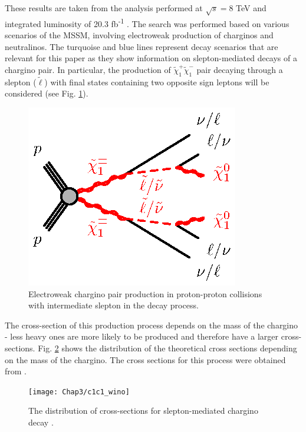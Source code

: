 These results are taken from the  analysis performed at $\sqrt{s}=$8 TeV and integrated luminosity of 20.3 fb\textsuperscript{-1} \citep{atlas2015search}. The search was performed based on various scenarios of the MSSM, involving electroweak production of charginos and neutralinos. The turquoise and blue lines represent decay scenarios that are relevant for this paper as they show information on slepton-mediated decays of a chargino pair. 
In particular, the production of $\tilde{\chi}^{+}_{1}\tilde{\chi}^{-}_{1}$ pair decaying through a slepton ($\tilde{\ell}$) with final states containing two opposite sign leptons will be considered (see Fig. \ref{fig:EWchargino}). 
\begin{figure}[!h]
  \centering   	
  	\captionsetup{width=0.8\textwidth}
	\includegraphics[]{Chap2/C1C1-llvvN1N1-slsnu}	
\caption[Feynman diagram of slepton-mediated chargino decay]{Electroweak chargino pair production in proton-proton collisions with intermediate slepton in the decay process.}\label{fig:EWchargino}
\end{figure}  

The cross-section of this production process depends on the mass of the chargino - less heavy ones are more likely to be produced and therefore have a larger cross-sections. Fig. \ref{fig:xsec} shows the distribution of the theoretical cross sections depending on the mass of the chargino.
The cross sections for this process were obtained from \citep{Fuks:2012qx,Fuks:2013vua}.

\begin{figure}
\centering
 \captionsetup{width=0.8\textwidth}
	\texttt{[image: Chap3/c1c1\_wino]}
	\caption{The distribution of cross-sections for slepton-mediated chargino decay \citep{xsec}.}
	\label{fig:xsec}
\end{figure}

